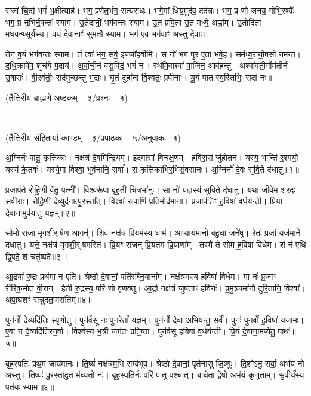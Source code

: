 राजा॑ चि॒द्यं भगं॑ भ॒क्षीत्याह॑।
भग॒ प्रणे॑त॒र्भग॒ सत्य॑राधः।
भगे॒मां धिय॒मुद॑व॒ दद॑न्नः।
भग॒ प्र णो॑ जनय॒ गोभि॒रश्वैः᳚।
भग॒ प्र नृभि॑र्नृ॒वन्तः॑ स्याम।
उ॒तेदानीं॒ भग॑वन्तः स्याम।
उ॒त प्रपि॒त्व उ॒त मध्ये॒ अह्ना᳚म्।
उ॒तोदि॑ता मघव॒न्थ्सूर्य॑स्य।
व॒यं दे॒वानाꣳ॑ सुम॒तौ स्या॑म।
भग॑ ए॒व भग॑वाꣳ अस्तु देवाः॥

तेन॑ व॒यं भग॑वन्तः स्याम।
तं त्वा॑ भग॒ सर्व॒ इज्जो॑हवीमि।
स नो॑ भग पुर ए॒ता भ॑वे॒ह।
सम॑ध्व॒रायो॒षसो॑ नमन्त।
द॒धि॒क्रावे॑व॒ शुच॑ये प॒दाय॑।
अ॒र्वा॒ची॒नं व॑सु॒विदं॒ भगं॑ नः।
रथ॑मि॒वाश्वा॑ वा॒जिन॒ आव॑हन्तु।
अश्वा॑वती॒र्गोम॑तीर्न उ॒षासः॑।
वी॒रव॑तीः॒ सद॑मुच्छन्तु भ॒द्राः।
घृ॒तं दुहा॑ना वि॒श्वतः॒ प्रपी॑नाः।
यू॒यं पा॑त स्व॒स्तिभिः॒ सदा॑ नः॥

\centerline{\scriptsize(तैत्तिरीय ब्राह्मणे अष्टकम् -- ३/प्रश्नः -- १)}\mbox{}\\[-2em]
\centerline{\scriptsize(तैत्तिरीय संहितायां काण्डम् -- ३/प्रपाठकः -- ५/अनुवाकः --१)}

अ॒ग्निर्नः॑ पातु॒ कृत्ति॑काः।
नक्ष॑त्रं दे॒वमि॑न्द्रि॒यम्।
इ॒दमा॑सां विचक्ष॒णम्।
ह॒विरा॒सं जु॑होतन।
यस्य॒ भान्ति॑ र॒श्मयो॒ यस्य॑ के॒तवः॑।
यस्ये॒मा विश्वा॒ भुव॑नानि॒ सर्वा᳚।
स कृत्ति॑काभि\-र॒भिसं॒वसा॑नः।
अ॒ग्निर्नो॑ दे॒वः सु॑वि॒ते द॑धातु॥१॥ 

प्र॒जाप॑ते रोहि॒णी वे॑तु॒ पत्नी᳚।
वि॒श्वरू॑पा बृह॒ती चि॒त्रभा॑नुः।
सा नो॑ य॒ज्ञस्य॑ सुवि॒ते द॑धातु।
यथा॒ जीवे॑म श॒रदः॒ सवी॑राः।
रो॒हि॒णी दे॒व्युद॑गात्पु॒रस्ता᳚त्।
विश्वा॑ रू॒पाणि॑ प्रति॒मोद॑माना।
प्र॒जाप॑तिꣳ ह॒विषा॑ व॒र्धय॑न्ती।
प्रि॒या दे॒वाना॒मुप॑यातु य॒ज्ञम्॥२॥ 

सोमो॒ राजा॑ मृगशी॒र्‌षेण॒ आगन्॑।
शि॒वं नक्ष॑त्रं प्रि॒यम॑स्य॒ धाम॑।
आ॒प्याय॑मानो बहु॒धा जने॑षु।
रेतः॑ प्र॒जां यज॑माने दधातु।
यत्ते॒ नक्ष॑त्रं मृगशी॒र्‌षमस्ति॑।
प्रि॒यꣳ रा॑जन् प्रि॒यत॑मं प्रि॒याणा᳚म्।
तस्मै॑ ते सोम ह॒विषा॑ विधेम।
शं न॑ एधि द्वि॒पदे॒ शं चतु॑ष्पदे॥३॥ 

आ॒र्द्रया॑ रु॒द्रः प्रथ॑मा न एति।
श्रेष्ठो॑ दे॒वानां॒ पति॑रघ्नि॒याना᳚म्।
नक्ष॑त्रमस्य ह॒विषा॑ विधेम।
मा नः॑ प्र॒जाꣳ री॑रिष॒न्मोत वी॒रान्।
हे॒ती रु॒द्रस्य॒ परि॑ णो वृणक्तु।
आ॒र्द्रा नक्ष॑त्रं जुषताꣳ ह॒विर्नः॑।
प्र॒मु॒ञ्चमा॑नौ दुरि॒तानि॒ विश्वा᳚।
अपा॒घशꣳ॑ सन्नुदता॒मरा॑तिम्॥४॥ 

पुन॑र्नो दे॒व्यदि॑तिः स्पृणोतु।
पुन॑र्वसू नः॒ पुन॒रेतां᳚ य॒ज्ञम्।
पुन॑र्नो दे॒वा अ॒भिय॑न्तु॒ सर्वे᳚।
पुनः॑ पुनर्वो ह॒विषा॑ यजामः।
ए॒वा न दे॒व्यदि॑तिरन॒र्वा।
विश्व॑स्य भ॒र्त्री जग॑तः प्रति॒ष्ठा।
पुन॑र्वसू ह॒विषा॑ व॒र्धय॑न्ती।
प्रि॒यं दे॒वाना॒मप्ये॑तु॒ पाथः॑॥५॥ 

बृह॒स्पतिः॑ प्रथ॒मं जाय॑मानः।
ति॒ष्यं॑ नक्ष॑त्रम॒भि सम्ब॑भूव।
श्रेष्ठो॑ दे॒वानां॒ पृत॑नासु जि॒ष्णुः।
दि॒शोऽनु॒ सर्वा॒ अभ॑यं नो अस्तु।
ति॒ष्यः॑ पु॒रस्ता॑दु॒त म॑ध्य॒तो नः॑।
बृह॒स्पति॑र्नः॒ परि॑ पातु प॒श्चात्।
बाधे॑तां॒ द्वेषो॒ अभ॑यं कृणुताम्।
सु॒वीर्य॑स्य॒ पत॑यः स्याम॥६॥ 


